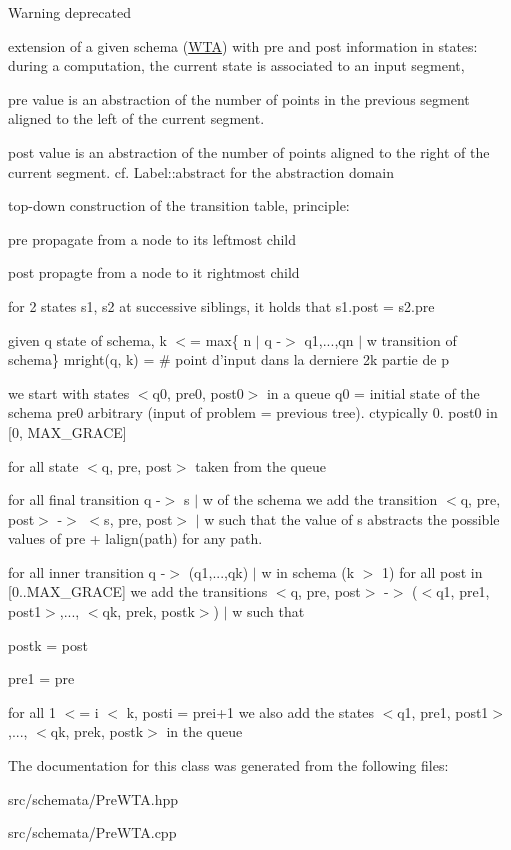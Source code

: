 \begin{DoxyWarning}{Warning}
deprecated
\end{DoxyWarning}
extension of a given schema (\mbox{\hyperlink{classWTA}{W\+TA}}) with pre and post information in states\+: during a computation, the current state is associated to an input segment,
\begin{DoxyItemize}
\item pre value is an abstraction of the number of points in the previous segment aligned to the left of the current segment.
\item post value is an abstraction of the number of points aligned to the right of the current segment. cf. Label\+::abstract for the abstraction domain
\end{DoxyItemize}

top-\/down construction of the transition table, principle\+:
\begin{DoxyItemize}
\item pre propagate from a node to its leftmost child
\item post propagte from a node to it rightmost child
\item for 2 states s1, s2 at successive siblings, it holds that s1.\+post = s2.\+pre
\end{DoxyItemize}

given q state of schema, k $<$= max\{ n $\vert$ q -\/$>$ q1,...,qn $\vert$ w transition of schema\} mright(q, k) = \# point d’input dans la derniere 2k partie de p

we start with states $<$q0, pre0, post0$>$ in a queue q0 = initial state of the schema pre0 arbitrary (input of problem = previous tree). ctypically 0. post0 in \mbox{[}0, M\+A\+X\+\_\+\+G\+R\+A\+CE\mbox{]}

for all state $<$q, pre, post$>$ taken from the queue

for all final transition q -\/$>$ s $\vert$ w of the schema we add the transition $<$q, pre, post$>$ -\/$>$ $<$s, pre, post$>$ $\vert$ w such that the value of s abstracts the possible values of pre + lalign(path) for any path.

for all inner transition q -\/$>$ (q1,...,qk) $\vert$ w in schema (k $>$ 1) for all post in \mbox{[}0..M\+A\+X\+\_\+\+G\+R\+A\+CE\mbox{]} we add the transitions $<$q, pre, post$>$ -\/$>$ ($<$q1, pre1, post1$>$,..., $<$qk, prek, postk$>$) $\vert$ w such that
\begin{DoxyItemize}
\item postk = post
\item pre1 = pre
\item for all 1 $<$= i $<$ k, posti = prei+1 we also add the states $<$q1, pre1, post1$>$,..., $<$qk, prek, postk$>$ in the queue 
\end{DoxyItemize}

The documentation for this class was generated from the following files\+:\begin{DoxyCompactItemize}
\item 
src/schemata/Pre\+W\+T\+A.\+hpp\item 
src/schemata/Pre\+W\+T\+A.\+cpp\end{DoxyCompactItemize}
